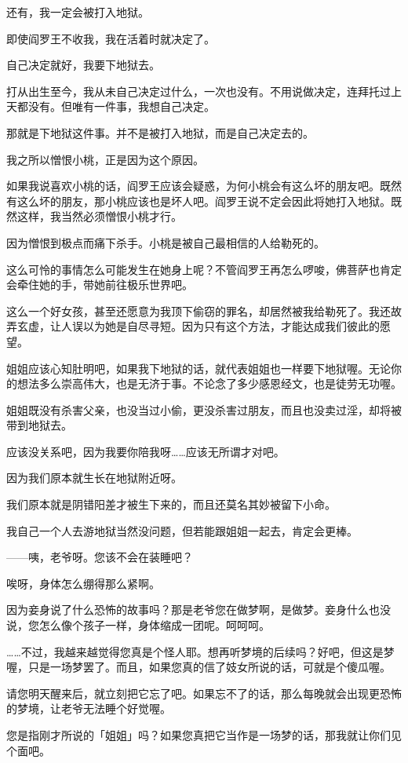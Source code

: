 \documentclass[portrait,a4paper]{article}
\begin{document}
还有，我一定会被打入地狱。

即使阎罗王不收我，我在活着时就决定了。

自己决定就好，我要下地狱去。

打从出生至今，我从未自己决定过什么，一次也没有。不用说做决定，连拜托过上天都没有。但唯有一件事，我想自己决定。

那就是下地狱这件事。并不是被打入地狱，而是自己决定去的。

我之所以憎恨小桃，正是因为这个原因。

如果我说喜欢小桃的话，阎罗王应该会疑惑，为何小桃会有这么坏的朋友吧。既然有这么坏的朋友，那小桃应该也是坏人吧。阎罗王说不定会因此将她打入地狱。既然这样，我当然必须憎恨小桃才行。

因为憎恨到极点而痛下杀手。小桃是被自己最相信的人给勒死的。

这么可怜的事情怎么可能发生在她身上呢？不管阎罗王再怎么啰唆，佛菩萨也肯定会牵住她的手，带她前往极乐世界吧。

这么一个好女孩，甚至还愿意为我顶下偷窃的罪名，却居然被我给勒死了。我还故弄玄虚，让人误以为她是自尽寻短。因为只有这个方法，才能达成我们彼此的愿望。

姐姐应该心知肚明吧，如果我下地狱的话，就代表姐姐也一样要下地狱喔。无论你的想法多么崇高伟大，也是无济于事。不论念了多少感恩经文，也是徒劳无功喔。

姐姐既没有杀害父亲，也没当过小偷，更没杀害过朋友，而且也没卖过淫，却将被带到地狱去。

应该没关系吧，因为我要你陪我呀……应该无所谓才对吧。

因为我们原本就生长在地狱附近呀。

我们原本就是阴错阳差才被生下来的，而且还莫名其妙被留下小命。

我自己一个人去游地狱当然没问题，但若能跟姐姐一起去，肯定会更棒。

——咦，老爷呀。您该不会在装睡吧？

唉呀，身体怎么绷得那么紧啊。

因为妾身说了什么恐怖的故事吗？那是老爷您在做梦啊，是做梦。妾身什么也没说，您怎么像个孩子一样，身体缩成一团呢。呵呵呵。

……不过，我越来越觉得您真是个怪人耶。想再听梦境的后续吗？好吧，但这是梦喔，只是一场梦罢了。而且，如果您真的信了妓女所说的话，可就是个傻瓜喔。

请您明天醒来后，就立刻把它忘了吧。如果忘不了的话，那么每晚就会出现更恐怖的梦境，让老爷无法睡个好觉喔。

您是指刚才所说的「姐姐」吗？如果您真把它当作是一场梦的话，那我就让你们见个面吧。
\end{document}
